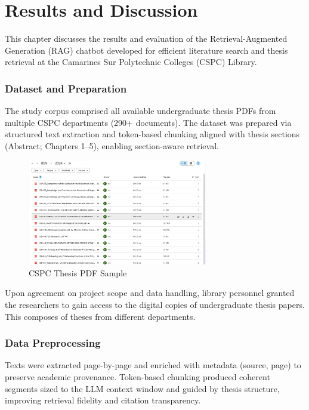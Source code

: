 \chapter{Results and Discussion}
\begin{refsection}

This chapter discusses the results and evaluation of the Retrieval-Augmented Generation (RAG) chatbot developed for efficient literature search and thesis retrieval at the Camarines Sur Polytechnic Colleges (CSPC) Library.

\subsection{Dataset and Preparation}
The study corpus comprised all available undergraduate thesis PDFs from multiple CSPC departments (290+ documents). The dataset was prepared via structured text extraction and token-based chunking aligned with thesis sections (Abstract; Chapters 1--5), enabling section-aware retrieval.

\begin{figure}[h]
    \centering
    \includegraphics[width=0.7\textwidth]{figures/dataset_sample.jpg}
    \caption{CSPC Thesis PDF Sample}
\end{figure}

Upon agreement on project scope and data handling, library personnel granted the researchers to gain access to the digital copies of undergraduate thesis papers. This composes of theses from different departments.

\subsection{Data Preprocessing}
Texts were extracted page-by-page and enriched with metadata (source, page) to preserve academic provenance. Token-based chunking produced coherent segments sized to the LLM context window and guided by thesis structure, improving retrieval fidelity and citation transparency.


\end{refsection}

